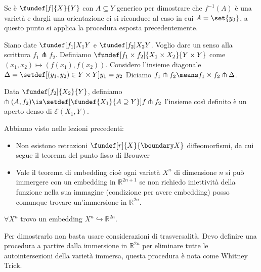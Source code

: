 Se è $\fundef[f]{X}{Y}$ con $A \subseteq Y$ generico per dimostrare che $f^{-1}(A)$ è una varietà e dargli una orientazione
ci si riconduce al caso in cui $A = \set{y_{0}}$, a questo punto si applica la procedura esposta precedentemente.

\begin{defn}
Siano date $\fundef[f_{1}]{X_{1}}{Y}$ e $\fundef[f_{2}]{X_{2}}{Y}$. Voglio dare un senso alla scrittura $f_{1} \pitchfork f_{2}$.
Definiamo $\fundef[f_1 \times f_2]{X_1 \times X_2}{Y \times Y}$ come $(x_{1}, x_{2}) \mapsto (f(x_{1}), f(x_{2}))$. Considero l'insieme diagonale $\Delta = \setdef[(y_{1}, y_{2}) \in Y \times Y]{y_{1} = y_{2}}$
Diciamo $f_{1} \pitchfork f_{2} \means f_{1} \times f_{2} \pitchfork \Delta$.
\end{defn}

\begin{teo}
Data $\fundef[f_2]{X_2}{Y}$, definiamo $\pitchfork(A, f_{2}) \is \setdef[\fundef{X_{1}}{A \supseteq Y}] {f\pitchfork f_{2}}$ l'insieme così definito è un aperto denso di $\mathcal{E}(X_{1}, Y)$.
\end{teo}

Abbiamo visto nelle lezioni precedenti:

\begin{itemize}
 \item Non esistono retrazioni $\fundef[r]{X}{\boundary X}$ diffeomorfismi, da cui segue il teorema del punto fisso di Brouwer
 \item Vale il teorema di embedding cioè ogni varietà $X^{n}$ di dimensione $n$ si può immergere con un embedding in $\mathbb{R}^{2n+1}$ se non richiedo iniettività della funzione nella sua 
 immagine (condizione per avere embedding) posso comunque trovare un'immersione in $\mathbb{R}^{2n}$. 
\end{itemize}

\begin{teo}  
$\forall X^{n}$ trovo un embedding $X^{n} \hookrightarrow \mathbb{R}^{2n}$.
\end{teo}

\begin{oss}
 Per dimostrarlo non basta usare considerazioni di trasversalità. Devo definire una procedura a partire dalla immersione in $\mathbb{R}^{2n}$ per
 eliminare tutte le autointersezioni della varietà immersa, questa procedura è nota come Whitney Trick.
\end{oss}



